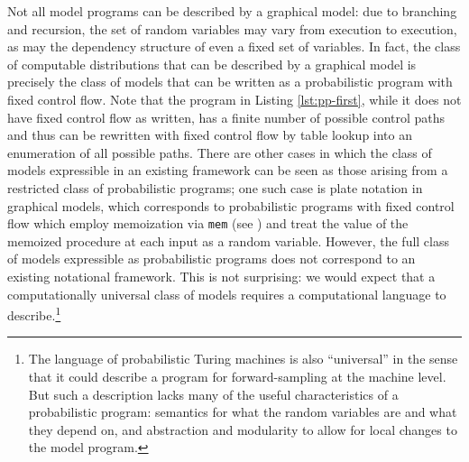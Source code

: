 Not all model programs can be described by a graphical model: due to
branching and recursion, the set of random variables may vary from
execution to execution, as may the dependency structure of even a fixed set
of variables.  In fact, the class of computable distributions that can be
described by a graphical model is precisely the class of models that can be
written as a probabilistic program with fixed control flow.  Note that the
program in Listing \ref{lst:pp-first}, while it does not have fixed control
flow as written, has a finite number of possible control paths and thus can
be rewritten with fixed control flow by table lookup into an enumeration of
all possible paths.  There are other cases in which the class of models
expressible in an existing framework can be seen as those arising from a
restricted class of probabilistic programs; one such case is plate notation
in graphical models, which corresponds to probabilistic programs with fixed
control flow which employ memoization via \texttt{mem} (see
\cite[\S2.1]{Church}) and treat the value of the memoized procedure at each
input as a random variable.  However, the full class of models expressible as
probabilistic programs does not correspond to an existing notational framework.
This is not surprising: we would expect that a computationally universal class
of models requires a computational language to describe.\footnote{
  The language of probabilistic Turing machines is also ``universal'' in
  the sense that it could describe a program for forward-sampling at the
  machine level.  But such a description lacks many of the useful
  characteristics of a probabilistic program: semantics for what the random
  variables are and what they depend on, and abstraction and modularity to
  allow for local changes to the model program.
}

